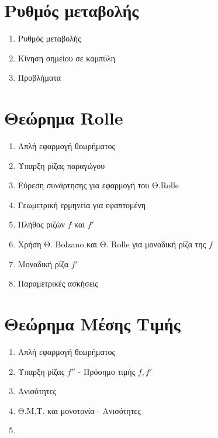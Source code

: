 \documentclass[twoside,nofonts,math,spyros,ektypwsh]{frontisthrio}
\begin{document}
\section{Ρυθμός μεταβολής}
\begin{multicols}{2}
\begin{enumerate}
\item Ρυθμός μεταβολής
\item Κίνηση σημείου σε καμπύλη
\item Προβλήματα
\end{enumerate}
\end{multicols}
\section{Θεώρημα Rolle}
\begin{multicols}{2}
\begin{enumerate}
\item Απλή εφαρμογή θεωρήματος
\item Ύπαρξη ρίζας παραγώγου
\item Εύρεση συνάρτησης για εφαρμογή του Θ.Rolle
\item Γεωμετρική ερμηνεία για εφαπτομένη
\item Πλήθος ριζών $ f $ και $ f' $
\item Χρήση Θ. Bolzano και Θ. Rolle για μοναδική ρίζα της $ f $
\item Μοναδική ρίζα $ f' $
\item Παραμετρικές ασκήσεις
\end{enumerate}
\end{multicols}
\section{Θεώρημα Μέσης Τιμής}
\begin{multicols}{2}
\begin{enumerate}
\item Απλή εφαρμογή θεωρήματος
\item Ύπαρξη ρίζας $ f'' $ - Πρόσημο τιμής $ f,f' $
\item Ανισότητες
\item Θ.Μ.Τ. και μονοτονία - Ανισότητες
\item 
\end{enumerate}
\end{multicols}
\end{document}
